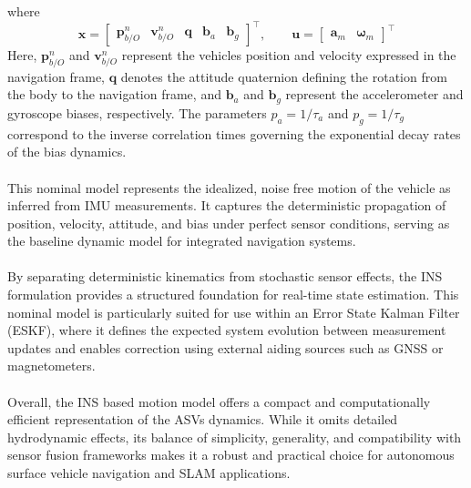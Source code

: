 where
\begin{equation}
    \mathbf{x} =
    \begin{bmatrix}
        \mathbf{p}_{b/O}^{n} & \mathbf{v}_{b/O}^{n} & \mathbf{q} & \mathbf{b}_a & \mathbf{b}_g
    \end{bmatrix}^\top,
    \qquad
    \mathbf{u} =
    \begin{bmatrix}
        \mathbf{a}_m & \boldsymbol{\omega}_m
    \end{bmatrix}^\top
    \label{eq:kinematics-motion-model-states}
\end{equation}
Here, $\mathbf{p}_{b/O}^{n}$ and $\mathbf{v}_{b/O}^{n}$ represent the vehicles position and velocity expressed in the navigation frame, $\mathbf{q}$ denotes the attitude quaternion defining the rotation from the body to the navigation frame, and $\mathbf{b}_a$ and $\mathbf{b}_g$ represent the accelerometer and gyroscope biases, respectively. The parameters $p_a = 1/\tau_a$ and $p_g = 1/\tau_g$ correspond to the inverse correlation times governing the exponential decay rates of the bias dynamics.  
\\ \\
This nominal model represents the idealized, noise free motion of the vehicle as inferred from IMU measurements. It captures the deterministic propagation of position, velocity, attitude, and bias under perfect sensor conditions, serving as the baseline dynamic model for integrated navigation systems.  
\\ \\
By separating deterministic kinematics from stochastic sensor effects, the INS formulation provides a structured foundation for real-time state estimation. This nominal model is particularly suited for use within an Error State Kalman Filter (ESKF), where it defines the expected system evolution between measurement updates and enables correction using external aiding sources such as GNSS or magnetometers.  
\\ \\
Overall, the INS based motion model offers a compact and computationally efficient representation of the ASVs dynamics. While it omits detailed hydrodynamic effects, its balance of simplicity, generality, and compatibility with sensor fusion frameworks makes it a robust and practical choice for autonomous surface vehicle navigation and SLAM applications.



